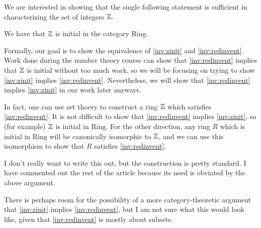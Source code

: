 \documentclass{article}
\begin{document}
We are interested in showing that the single following statement is sufficient in characterizing the set of integers $\mathbb Z.$
\begin{inv} \label{inv:zinit}
	We have that $\mathbb Z$ is initial in the category $\mathrm{Ring}.$
\end{inv}
Formally, our goal is to show the equivalence of \autoref{inv:zinit} and \autoref{inv:redinvent}. Work done during the number theory course can show that \autoref{inv:redinvent} implies that $\mathbb Z$ is initial without too much work, so we will be focusing on trying to show \autoref{inv:zinit} implies \autoref{inv:redinvent}. Nevertheless, we will show that \autoref{inv:redinvent} implies \autoref{inv:zinit} in our work later anyways.
\begin{idea}
	In fact, one can use set thoery to construct a ring $\mathbb Z$ which satisfies \autoref{inv:redinvent}. It is not difficult to show that \autoref{inv:redinvent} implies \autoref{inv:zinit}, so (for example) $\mathbb Z$ is initial in $\mathrm{Ring}$. For the other direction, any ring $R$ which is initial in $\mathrm{Ring}$ will be canonically isomorphic to $\mathbb Z$, and we can use this isomorphism to show that $R$ satisfies \autoref{inv:redinvent}.
\end{idea}
I don't really want to write this out, but the construction is pretty standard. I have commented out the rest of the article because its need is obviated by the above argument.

There is perhaps room for the possibility of a more category-theoretic argument that \autoref{inv:zinit} implies \autoref{inv:redinvent}, but I am not sure what this would look like, given that \autoref{inv:redinvent} is mostly about subsets.

\end{document}

